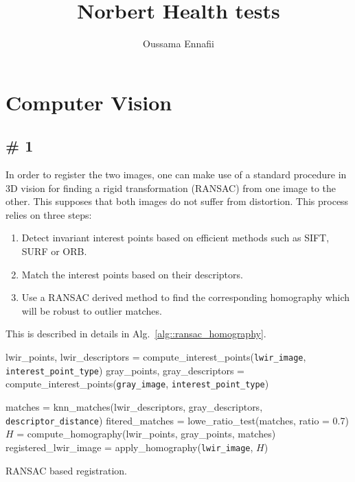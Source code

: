 \documentclass[10pt]{article}
\title{Norbert Health tests}
\author{Oussama Ennafii}
\begin{document}
    \maketitle

    \section*{Computer Vision}
        \subsection*{\# 1}
            In order to register the two images, one can make use of a standard procedure in 3D vision for finding a rigid transformation (RANSAC) from one image to the other.
            This supposes that both images do not suffer from distortion.
            This process relies on three steps:
            \begin{enumerate}
                \item Detect invariant interest points based on efficient methods such as SIFT, SURF or ORB.
                \item Match the interest points based on their descriptors.
                \item Use a RANSAC derived method to find the corresponding homography which will be robust to outlier matches.
            \end{enumerate}
            This is described in details in Alg.~\ref{alg::ransac_homography}.

            \begin{algorithm}[htb]

                lwir\_points, lwir\_descriptors = compute\_interest\_points(\texttt{lwir\_image}, \texttt{interest\_point\_type})\;
                gray\_points, gray\_descriptors = compute\_interest\_points(\texttt{gray\_image}, \texttt{interest\_point\_type})\;

                matches = knn\_matches(lwir\_descriptors, gray\_descriptors, \texttt{descriptor\_distance})\;
                fitered\_matches = lowe\_ratio\_test(matches, ratio = 0.7)\;
                \(H\) = compute\_homography(lwir\_points, gray\_points, matches)\;
                registered\_lwir\_image = apply\_homography(\texttt{lwir\_image}, \(H\))\;
                \caption{\label{alg::ransac_homography} RANSAC based registration.}
            \end{algorithm}
\end{document}
